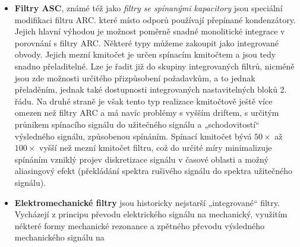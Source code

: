 \begin{itemize}
                operační zesilovače. Mají obdobné vlastnosti jako filtry RLC. ale vzhledem k
                vlastnostem aktivních prvků se jejich použití omezuje nejčastéji na kmitočtové pásmo
                přibližné \SI{0.1}{\hertz} až \SI{100}{\kilo\hertz}. Současný pokrok v technologii
                aktivních prvků však umožňuje využití těchto filtrů na stále vyšších kmitočtech
                (dnes již řádové jednotky až desítky \si{\mega\hertz}), i když toto použití je zatím
                málo rozšířené. Kmitočtově jsou tedy vhodným doplňkem k filtrům RLC. Oproti nim mají
                výhodu i v snazší nastavitelnosti a laditelnosti změnou hodnot odporů. Jejich
                nevýhodou je na druhé straně potřeba napájení aktivních prvků. Objevují se i jejich
                specifické modifikace využívající parazitních vlastností aktivních prvků (R nebo C)
                jako stavebních prvků - filtry AC. AR apod.
          \item \textbf{Filtry ASC}, známé též jako \emph{filtry se spínanými kapacitory} jsou
                speciální modifikaci filtru ARC. které místo odporů používají přepínané
                kondenzátory. Jejich hlavní výhodou je možnost poměrně snadné monolitické integrace
                v porovnání s filtry ARC. Některé typy můžeme zakoupit jako integrované obvody.
                Jejich mezní kmitočet je určen spínacím kmitočtem a jsou tedy snadno přeladitelné.
                Lze je řadit již do skupiny integrovaných filtrů, nicméně jsou zde možnosti
                určitého přizpůsobení požadavkům, a to jednak přeladěním, jednak také dostupnosti
                integrovaných nastavitelných bloků 2. řádu. Na druhé straně je však tento typ
                realizace kmitočtově ještě více omezen než filtry ARC a má navíc problémy s vyšším
                driftem, s určitým průnikem spínacího signálu do užitečného signálu a
                „schodovitostí“ výsledného signálu, způsobenou spínáním. Spínací kmitočet bývá
                \(\num{50}\times\) až \(\num{100}\times\) vyšší než mezní kmitočet filtru, což do
                určité míry minimalizuje spínáním vzniklý projev diskretizace signálu v časové
                oblasti a možný aliasingový efekt (překládání spektra rušivého signálu do spektra
                užitečného signálu).
          \item \textbf{Elektromechanické filtry} jsou historicky nejstarší „integrované“ filtry.
                Vycházejí z principu převodu elektrického signálu na mechanický, využitím nékteré
                formy mechanické rezonance a zpětného převodu výsledného mechanického signálu na

\end{itemize}
